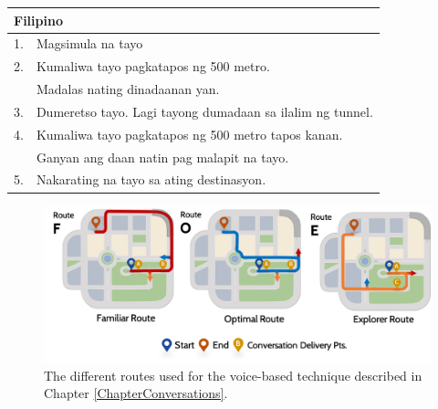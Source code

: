 \begin{table}[h]
\begin{tabular}{ll}
\multicolumn{2}{l}{Filipino}                                                                                           \\ \hline
1. & Magsimula na tayo                                                                                                 \\
2. & Kumaliwa tayo pagkatapos ng 500 metro. \\ 
   & Madalas nating dinadaanan yan.  \\
3. & Dumeretso tayo. Lagi tayong dumadaan sa ilalim ng tunnel.                                                         \\
4. & Kumaliwa tayo pagkatapos ng 500 metro tapos kanan. \\ 
   & Ganyan ang daan natin pag malapit na tayo.         \\
5. & Nakarating na tayo sa ating destinasyon.                                                                          \\ \hline
\end{tabular}
\end{table}

\begin{figure}[h]
  \centering
  \includegraphics[scale=0.6]{figures/s2-all-routes.png}
  \caption{The different routes used for the voice-based technique described in Chapter \ref{ChapterConversations}.}
  \label{fig:b-all-routes}
\end{figure}

